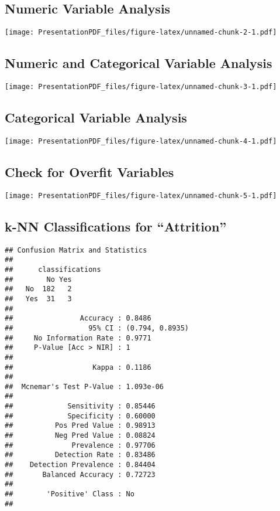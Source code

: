 \documentclass[]{article}
\begin{document}
\hypertarget{numeric-variable-analysis}{%
\subsection{Numeric Variable Analysis}\label{numeric-variable-analysis}}

\texttt{[image: PresentationPDF\_files/figure-latex/unnamed-chunk-2-1.pdf]}

\hypertarget{numeric-and-categorical-variable-analysis}{%
\subsection{Numeric and Categorical Variable
Analysis}\label{numeric-and-categorical-variable-analysis}}

\texttt{[image: PresentationPDF\_files/figure-latex/unnamed-chunk-3-1.pdf]}

\hypertarget{categorical-variable-analysis}{%
\subsection{Categorical Variable
Analysis}\label{categorical-variable-analysis}}

\texttt{[image: PresentationPDF\_files/figure-latex/unnamed-chunk-4-1.pdf]}

\hypertarget{check-for-overfit-variables}{%
\subsection{Check for Overfit
Variables}\label{check-for-overfit-variables}}

\texttt{[image: PresentationPDF\_files/figure-latex/unnamed-chunk-5-1.pdf]}

\hypertarget{k-nn-classifications-for-attrition}{%
\subsection{k-NN Classifications for
``Attrition''}\label{k-nn-classifications-for-attrition}}

\begin{verbatim}
## Confusion Matrix and Statistics
## 
##      classifications
##        No Yes
##   No  182   2
##   Yes  31   3
##                                          
##                Accuracy : 0.8486         
##                  95% CI : (0.794, 0.8935)
##     No Information Rate : 0.9771         
##     P-Value [Acc > NIR] : 1              
##                                          
##                   Kappa : 0.1186         
##                                          
##  Mcnemar's Test P-Value : 1.093e-06      
##                                          
##             Sensitivity : 0.85446        
##             Specificity : 0.60000        
##          Pos Pred Value : 0.98913        
##          Neg Pred Value : 0.08824        
##              Prevalence : 0.97706        
##          Detection Rate : 0.83486        
##    Detection Prevalence : 0.84404        
##       Balanced Accuracy : 0.72723        
##                                          
##        'Positive' Class : No             
## 
\end{verbatim}
\end{document}
